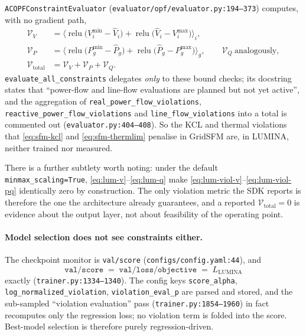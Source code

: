 \documentclass[11pt]{article}
\newcommand{\pred}[1]{\widehat{#1}}
\newcommand{\code}[1]{\texttt{\small #1}}
\newcommand{\relu}{\operatorname{relu}}
\begin{document}
\code{ACOPFConstraintEvaluator} (\code{evaluator/opf/evaluator.py:194--373}) computes, with
no gradient path,
\begin{align}
\mathcal{V}_V &= \Big\langle \relu\!\big(V^{\min}_i-\pred{V}_i\big)+\relu\!\big(\pred{V}_i-V^{\max}_i\big)\Big\rangle_i,
\label{eq:lum-viol-v}\\
\mathcal{V}_{P} &= \Big\langle \relu\!\big(P^{\min}_g-\pred{P}_g\big)+\relu\!\big(\pred{P}_g-P^{\max}_g\big)\Big\rangle_g,
\qquad
\mathcal{V}_{Q}\ \text{analogously},
\label{eq:lum-viol-pq}\\
\mathcal{V}_{\mathrm{total}} &= \mathcal{V}_V+\mathcal{V}_P+\mathcal{V}_Q .
\label{eq:lum-viol-tot}
\end{align}
\code{evaluate\_all\_constraints} delegates \emph{only} to these bound checks; its
docstring states that ``power-flow and line-flow evaluations are planned but not yet
active'', and the aggregation of \code{real\_power\_flow\_violations},
\code{reactive\_power\_flow\_violations} and \code{line\_flow\_violations} into a total is
commented out (\code{evaluator.py:404--408}). So the KCL and thermal violations that
\eqref{eq:sfm-kcl} and \eqref{eq:sfm-thermlim} penalise in GridSFM are, in LUMINA, neither
trained nor measured.

There is a further subtlety worth noting: under the default
\code{minmax\_scaling=True}, \eqref{eq:lum-v}--\eqref{eq:lum-q} make
\eqref{eq:lum-viol-v}--\eqref{eq:lum-viol-pq} identically zero by construction. The only
violation metric the SDK reports is therefore the one the architecture already guarantees,
and a reported $\mathcal{V}_{\mathrm{total}}=0$ is evidence about the output layer, not
about feasibility of the operating point.

\paragraph{Model selection does not see constraints either.} The checkpoint monitor is
\code{val/score} (\code{configs/config.yaml:44}), and
\begin{equation}
\texttt{val/score} \;=\; \texttt{val/loss/objective} \;=\; L_{\mathrm{LUMINA}}
\label{eq:lum-score}
\end{equation}
exactly (\code{trainer.py:1334--1340}). The config keys \code{score\_alpha},
\code{log\_normalized\_violation}, \code{violation\_eval\_p} are parsed and stored, and the
sub-sampled ``violation evaluation'' pass (\code{trainer.py:1854--1960}) in fact recomputes
only the regression loss; no violation term is folded into the score. Best-model selection
is therefore purely regression-driven.
\end{document}

